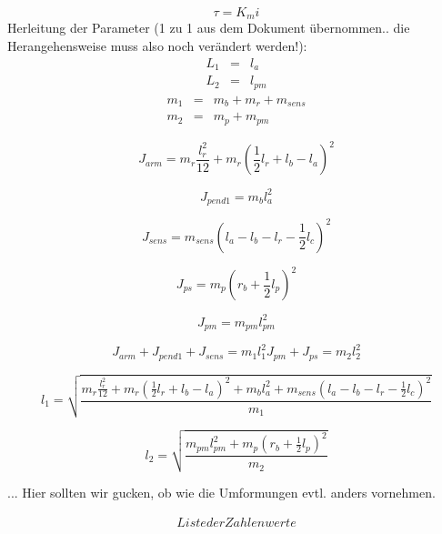 \begin{equation}
\tau=K_mi
\end{equation}
Herleitung der Parameter (1 zu 1 aus dem Dokument übernommen.. die Herangehensweise muss also noch verändert werden!):
\begin{eqnarray}
L_1 &=& l_a \nonumber \\
L_2 &=& l_{pm}
\end{eqnarray}
\begin{eqnarray}
m_1 &=& m_b+m_r+m_{sens} \nonumber \\
m_2 &=& m_p+m_{pm}
\end{eqnarray}

\begin{equation}
J_{arm} = m_r \frac{l^2_r}{12}+m_r(\frac{1}{2}l_r+l_b-l_a)^2
\end{equation}

\begin{equation}
J_{pend1}=m_bl^2_a
\end{equation}

\begin{equation}
J_{sens}=m_{sens}(l_a-l_b-l_r-\frac{1}{2}l_c)^2
\end{equation}

\begin{equation}
J_{ps}=m_p(r_b+\frac{1}{2}l_p)^2
\end{equation}

\begin{equation}
J_{pm}=m_{pm}l^2_{pm}
\end{equation}

\begin{equation}
J_{arm}+J_{pend1}+J_{sens}=m_1l^2_1J_{pm}+J_{ps}=m_2l^2_2
\end{equation}

\begin{equation}
l_1=\sqrt{\frac{m_r \frac{l^2_r}{12}+m_r(\frac{1}{2}l_r+l_b-l_a)^2+m_bl^2_a+m_{sens}(l_a-l_b-l_r-\frac{1}{2}l_c)^2}{m_1}}
\end{equation}

\begin{equation}
l_2=\sqrt{\frac{m_{pm}l^2_{pm}+m_p(r_b+\frac{1}{2}l_p)^2}{m_2}}
\end{equation}

... Hier sollten wir gucken, ob wie die Umformungen evtl. anders vornehmen.

\begin{eqnarray}
Liste der Zahlenwerte
\end{eqnarray}

